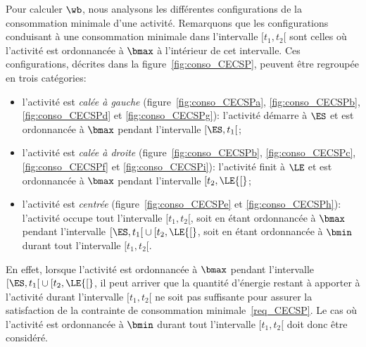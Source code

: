 Pour calculer $\wb$, nous analysons les différentes configurations de
la consommation minimale d'une activité. Remarquons que les
configurations conduisant à une consommation minimale dans
l'intervalle $[t_1,t_2{[}$ sont celles où l'activité est ordonnancée à
$\bmax$ à l'intérieur de cet intervalle. Ces configurations, décrites
dans la figure~\ref{fig:conso_CECSP}, peuvent être regroupée en trois
catégories:
\begin{itemize}
\item l'activité est {\it calée à
    gauche} (figure~\ref{fig:conso_CECSPa}, \ref{fig:conso_CECSPb},
  \ref{fig:conso_CECSPd} et \ref{fig:conso_CECSPg}): l'activité démarre
  à $\ES$ et est ordonnancée à $\bmax$ pendant l'intervalle
  $[\ES,t_1{[}$;
\item l'activité est {\it calée à
    droite} (figure~\ref{fig:conso_CECSPb}, \ref{fig:conso_CECSPc},
  \ref{fig:conso_CECSPf} et \ref{fig:conso_CECSPi}): l'activité finit à
  $\LE$ et est ordonnancée à $\bmax$ pendant l'intervalle $[t_2,\LE{[}$;
\item l'activité est {\it centrée} (figure~\ref{fig:conso_CECSPe} et
  \ref{fig:conso_CECSPh}): l'activité occupe tout l'intervalle
  $[t_1,t_2[$, soit en étant ordonnancée à $\bmax$ pendant l'intervalle
  $[\ES,t_1{[} \cup [t_2,\LE{[}$, soit en étant ordonnancée à $\bmin$
  durant tout l'intervalle $[t_1,t_2{[}$.
\end{itemize}
En effet, lorsque l'activité est ordonnancée à $\bmax$ pendant
l'intervalle $[\ES,t_1{[} \cup [t_2,\LE{[}$, il peut arriver que la
quantité d'énergie restant à apporter à l'activité durant l'intervalle
$[t_1,t_2[$ ne soit pas suffisante pour assurer la satisfaction de la
contrainte de consommation minimale~\eqref{req_CECSP}. Le cas où
l'activité est ordonnancée à $\bmin$ durant tout l'intervalle
$[t_1,t_2{[}$ doit donc être considéré.

